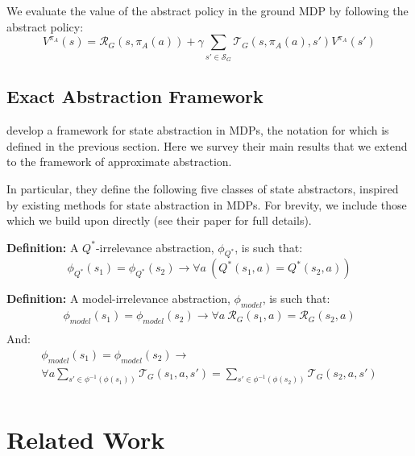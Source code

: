\documentclass{article}
\newcommand\defn[1]{{\bf Definition:} #1}
\begin{document}
We evaluate the value of the abstract policy in the ground MDP by following the abstract policy:
\begin{equation}
V^{\pi_A}(s) = \mathcal{R}_G(s,\pi_A(a)) + \gamma \sum_{s' \in \mathcal{S}_G} \mathcal{T}_G(s,\pi_A(a),s')V^{\pi_A}(s')
\end{equation}


\subsection{Exact Abstraction Framework}

\citep{li2006towards} develop a framework for state abstraction in \acp{MDP}, the notation for which is defined in the previous section. Here we survey their main results that we extend to the framework of approximate abstraction.

In particular, they define the following five classes of state abstractors, inspired by existing methods for state abstraction in \acp{MDP}. For brevity, we include those which we build upon directly (see their paper for full details).

\defn{A $Q^*$-irrelevance abstraction, $\phi_{Q^*}$, is such that:
\begin{equation}
\phi_{Q^*}(s_1) = \phi_{Q^*}(s_2) \longrightarrow \forall a\ \left(Q^*(s_1,a) = Q^*(s_2,a)\right)
\end{equation}
}

\defn{A model-irrelevance abstraction, $\phi_{model}$, is such that:
\begin{multline}
\phi_{model}(s_1) = \phi_{model}(s_2) \rightarrow \forall a\ \mathcal{R}_G(s_1,a) = \mathcal{R}_G(s_2,a) \\
\end{multline}
And:
\begin{multline}
\phi_{model}(s_1) = \phi_{model}(s_2) \rightarrow \\ \forall a \sum_{s' \in \phi^{-1}(\phi(s_1))} \mathcal{T}_G(s_1,a,s') =\sum_{s' \in \phi^{-1}(\phi(s_2))} \mathcal{T}_G(s_2,a,s') \\
\end{multline}
}


\section{Related Work}
\end{document}
